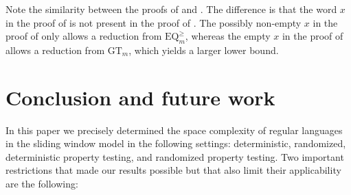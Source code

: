 \documentclass{article}\usepackage[a4paper,margin=20mm]{geometry}
\renewcommand{\geq}{\geqslant}
\begin{document}
Note the similarity between the proofs of   and . The difference
is that the word $x$ in the proof of  is not present in the proof of .
The possibly non-empty $x$ in the proof of  only allows a reduction from $\mathrm{EQ}^{\geq}_m$,
whereas the empty $x$ in the proof of  allows a reduction from $\mathrm{GT}_m$, which
yields a larger lower bound.


\section{Conclusion and future work}

In this paper we precisely determined the space complexity of regular languages in the sliding window model
in the following settings: deterministic, randomized, deterministic property testing, and randomized property testing.
Two important restrictions that made our results possible but that also
 limit their applicability are the following:
\end{document}
